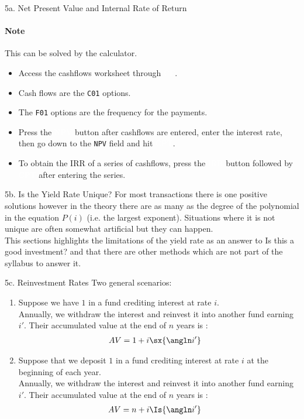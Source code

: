 \begin{CHPT_SUMM_AUTO}[label = {L.-5a}]{5a. Net Present Value and Internal Rate of Return}
\paragraph{Note}	This can be solved by the calculator.
\begin{itemize}[leftmargin = *]
	\item	Access the cashflows worksheet through \colorbox{arsenic}{\textcolor{white}{CF}}.
	\item	Cash flows are the \texttt{C01} options.
	\item	The \texttt{F01} options are the frequency for the payments.
	\item	Press the \colorbox{arsenic}{\textcolor{white}{NPV}} button after cashflows are entered, enter the interest rate, then go down to the \texttt{NPV} field and hit \colorbox{arsenic}{\textcolor{white}{CPT}}.
	\item	To obtain the IRR of a series of cashflows, press the \colorbox{arsenic}{\textcolor{white}{IRR}} button followed by \colorbox{arsenic}{\textcolor{white}{CPT}} after entering the series.
\end{itemize}
\end{CHPT_SUMM_AUTO}

\begin{CHPT_SUMM_AUTO}[label = {L.-5b}]{5b. Is the Yield Rate Unique?}
For most transactions there is one positive solutions however in the theory there are as many as the degree of the polynomial in the equation $P(i)$ (i.e. the largest exponent). Situations where it is not unique are often somewhat artificial but they can happen. \\

This sections highlights the limitations of the yield rate as an answer to \og Is this a good investment? \fg{} and that there are other methods which are not part of the syllabus to answer it.
\end{CHPT_SUMM_AUTO}

\begin{CHPT_SUMM_AUTO}[label = {L.-5c}]{5c. Reinvestment Rates}
Two general scenarios:
\begin{enumerate}[leftmargin = *]
	\item	Suppose we have $1$ in a fund crediting interest at rate $i$.\\
			Annually, we withdraw the interest and reinvest it into another fund earning $i'$.
			Their accumulated value at the end of $n$ years is :
			\begin{align*}
			AV
			&=	1 + i \sx{\angln i'}
			\end{align*}
	\item	Suppose that we deposit $1$ in a fund crediting interest at rate $i$ at the beginning of each year.\\
			Annually, we withdraw the interest and reinvest it into another fund earning $i'$.
			Their accumulated value at the end of $n$ years is :
			\begin{align*}
			AV
			&=	n + i \Is{\angln i'}
			\end{align*}
\end{enumerate}
\end{CHPT_SUMM_AUTO}

